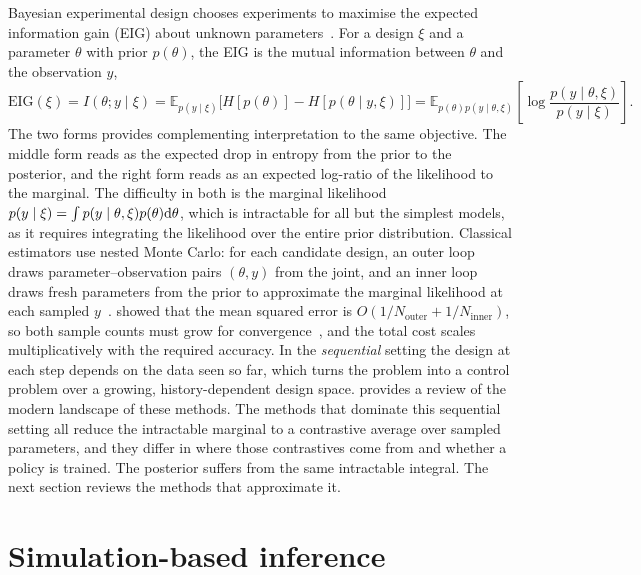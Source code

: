 Bayesian experimental design chooses experiments to maximise the expected information gain
(EIG) about unknown parameters~\citep{lindley1956measure,chaloner1995bayesian,ryan2016review}.
For a design $\xi$ and a parameter $\theta$ with prior $p(\theta)$, the EIG is the mutual
information between $\theta$ and the observation $y$,
\begin{equation}
\label{eq:rw-eig}
\mathrm{EIG}(\xi)=I(\theta;y\mid\xi)
=\mathbb{E}_{p(y\mid\xi)}\!\big[H[p(\theta)]-H[p(\theta\mid y,\xi)]\big]
=\mathbb{E}_{p(\theta)p(y\mid\theta,\xi)}\!\left[\log\frac{p(y\mid\theta,\xi)}{p(y\mid\xi)}\right].
\end{equation}
The two forms provides complementing interpretation to the same objective. The middle form reads as the expected drop in entropy from the prior to the posterior, and the right form reads as an expected
log-ratio of the likelihood to the marginal. The difficulty in both is the marginal likelihood $p(y\mid\xi)=\int p(y\mid\theta,\xi)p(\theta)\mathrm{d}\theta$, which is intractable
for all but the simplest models, as it requires integrating the likelihood over the entire prior distribution. 
Classical estimators use nested Monte Carlo: for each candidate design, an outer loop draws parameter–observation pairs $(\theta, y)$ from the joint, and an inner loop draws fresh parameters from the prior to approximate the marginal likelihood at each sampled $y$~\citep{ryan2016review,huan2014simulation}. \citet{rainforth2018nesting} showed that the mean squared error is $O(1/N_{\mathrm{outer}} + 1/N_{\mathrm{inner}})$, so both sample counts must grow for convergence~\citep{rainforth2018nesting}, and the total cost scales multiplicatively with the required accuracy. In the \emph{sequential} setting the design at each step depends on the data seen so far, which
turns the problem into a control problem over a growing, history-dependent design space. \citet{rainforth2024modern} provides a review of the modern landscape of these methods. The methods that dominate this sequential setting all reduce the intractable marginal to a contrastive average over sampled parameters, and they differ in where those contrastives come from and whether a policy is trained. The posterior suffers from the same intractable integral. The next section reviews the methods that approximate it.


\section{Simulation-based inference}
\label{sec:rw-sbi}

